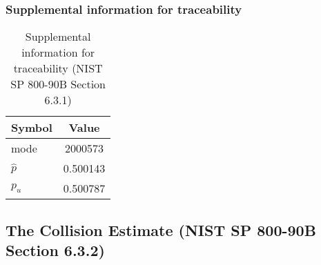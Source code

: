 \documentclass[a3paper,xelatex,english]{bxjsarticle}
\begin{document}
\subsubsection{Supplemental information for traceability}
\renewcommand{\arraystretch}{1.8}
\begin{table}[h]
\caption{Supplemental information for traceability (NIST SP 800-90B Section 6.3.1)}
\begin{center}
\begin{tabular}{|l|c|}
\hline 
\rowcolor{anotherlightblue} %
Symbol				& Value \\ \hline 
mode				&  2000573\\ \hline 
$\hat{p}$ 			& 0.500143\\ \hline
$p_u$				& 0.500787\\ \hline
\end{tabular}
\end{center}
\end{table}
\renewcommand{\arraystretch}{1.4}
\clearpage
\subsection{The Collision Estimate (NIST SP 800-90B Section 6.3.2)}\label{sec:Binary632}
\end{document}

